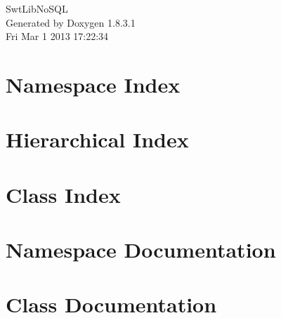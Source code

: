 \documentclass{book}
\begin{document}
\hypersetup{pageanchor=false,citecolor=blue}
\begin{titlepage}
\vspace*{7cm}
\begin{center}
{\Large Swt\-Lib\-No\-S\-Q\-L }\\
\vspace*{1cm}
{\large Generated by Doxygen 1.8.3.1}\\
\vspace*{0.5cm}
{\small Fri Mar 1 2013 17:22:34}\\
\end{center}
\end{titlepage}
\clearemptydoublepage
{}
\tableofcontents
\clearemptydoublepage
{}
\hypersetup{pageanchor=true,citecolor=blue}
\chapter{Namespace Index}

\chapter{Hierarchical Index}

\chapter{Class Index}

\chapter{Namespace Documentation}

\chapter{Class Documentation}







\printindex
\end{document}
